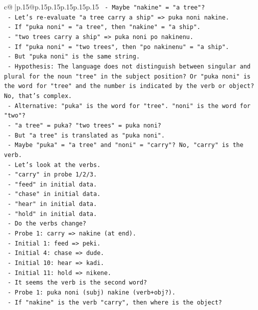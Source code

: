 \documentclass{article}
\begin{document}
{\begin{supertabular}{c@{$\;$}|p{.15\linewidth}@{}p{.15\linewidth}p{.15\linewidth}p{.15\linewidth}p{.15\linewidth}p{.15\linewidth}}
{{{\texttt{  {-} Maybe "nakine" = "a tree"?} \\
\texttt{  {-} Let's re{-}evaluate "a tree carry a ship" => puka noni nakine.} \\
\texttt{  {-} If "puka noni" = "a tree", then "nakine" = "a ship".} \\
\texttt{  {-} "two trees carry a ship" => puka noni po nakinenu.} \\
\texttt{  {-} If "puka noni" = "two trees", then "po nakinenu" = "a ship".} \\
\texttt{  {-} But "puka noni" is the same string.} \\
\texttt{  {-} Hypothesis: The language does not distinguish between singular and plural for the noun "tree" in the subject position? Or "puka noni" is the word for "tree" and the number is indicated by the verb or object? No, that's complex.} \\
\texttt{  {-} Alternative: "puka" is the word for "tree". "noni" is the word for "two"?} \\
\texttt{  {-} "a tree" = puka? "two trees" = puka noni?} \\
\texttt{  {-} But "a tree" is translated as "puka noni".} \\
\texttt{  {-} Maybe "puka" = "a tree" and "noni" = "carry"? No, "carry" is the verb.} \\
\texttt{  {-} Let's look at the verbs.} \\
\texttt{  {-} "carry" in probe 1/2/3.} \\
\texttt{  {-} "feed" in initial data.} \\
\texttt{  {-} "chase" in initial data.} \\
\texttt{  {-} "hear" in initial data.} \\
\texttt{  {-} "hold" in initial data.} \\
\texttt{  {-} Do the verbs change?} \\
\texttt{  {-} Probe 1: carry => nakine (at end).} \\
\texttt{  {-} Initial 1: feed => peki.} \\
\texttt{  {-} Initial 4: chase => dude.} \\
\texttt{  {-} Initial 10: hear => kadi.} \\
\texttt{  {-} Initial 11: hold => nikene.} \\
\texttt{  {-} It seems the verb is the second word?} \\
\texttt{  {-} Probe 1: puka noni (subj) nakine (verb+obj?).} \\
\texttt{  {-} If "nakine" is the verb "carry", then where is the object?} \\
}}}
\end{supertabular}}
\end{document}
